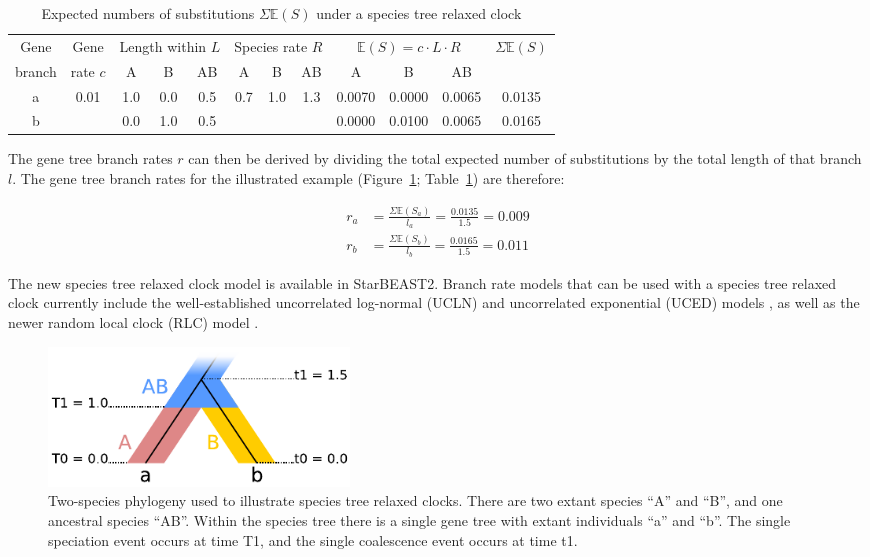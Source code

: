 \documentclass[nogrid]{MBE}%
\begin{document}
\begin{table}[htb!]
\caption{Expected numbers of substitutions $\Sigma \mathbb{E}(S)$ under a species tree relaxed clock}
\label{tab:branchRateModel}
\begin{threeparttable}
\begin{tabular*}{\textwidth}{@{\extracolsep{\fill}}cccccccccccc@{}}
\hline
Gene & Gene & \multicolumn{3}{c}{Length within $L$} & \multicolumn{3}{c}{Species rate $R$} & \multicolumn{3}{c}{$\mathbb{E}(S) = c\cdot L\cdot R$} & \multirow{2}{*}{$\Sigma \mathbb{E}(S)$}\tabularnewline
branch & rate $c$ & A & B & AB & A & B & AB & A & B & AB & \tabularnewline
\hline
a & \multirow{2}{*}{0.01} & 1.0 & 0.0 & 0.5 & \multirow{2}{*}{0.7} & \multirow{2}{*}{1.0} & \multirow{2}{*}{1.3} & 0.0070 & 0.0000 & 0.0065 & 0.0135\tabularnewline
b & & 0.0 & 1.0 & 0.5 & & & & 0.0000 & 0.0100 & 0.0065 & 0.0165\tabularnewline
\hline
\end{tabular*}
\end{threeparttable}
\end{table}

The gene tree branch rates $r$ can then be derived by dividing the total
expected number of substitutions by the total length of that branch $l$. The
gene tree branch rates for the illustrated example
(Figure~\ref{fig:branchRateModel}; Table~\ref{tab:branchRateModel}) are
therefore:

\begin{align}
r_a &= \frac{\Sigma \mathbb{E}(S_a)}{l_a} = \frac{0.0135}{1.5} = 0.009\\
r_b &= \frac{\Sigma \mathbb{E}(S_b)}{l_b} = \frac{0.0165}{1.5} = 0.011
\end{align}

The new species tree relaxed clock model is available in StarBEAST2. Branch rate
models that can be used with a species tree relaxed clock currently include the
well-established uncorrelated log-normal (UCLN) and uncorrelated exponential
(UCED) models \citep{10.1371/journal.pbio.0040088}, as well as the newer random
local clock (RLC) model \citep{Drummond2010}.

\begin{figure}[htb!]
\centering
\includegraphics[width=8cm]{relaxed_clock.pdf}
\caption
{Two-species phylogeny used to illustrate species tree relaxed
clocks. There are two extant species ``A'' and ``B'', and one ancestral species ``AB''.
Within the species tree there is a single gene tree with extant individuals ``a''
and ``b''. The single speciation event occurs at time T1, and the single coalescence
event occurs at time t1.}
\label{fig:branchRateModel}
\end{figure}
\end{document}
